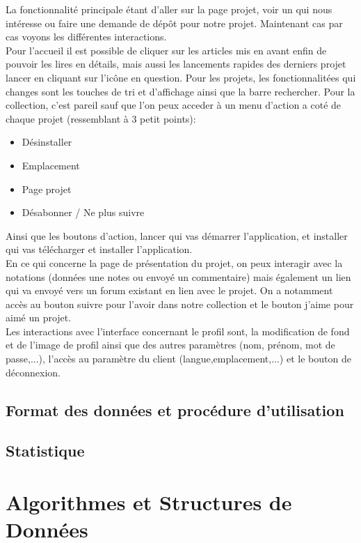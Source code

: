 \documentclass{report}
\begin{document}
\vspace{0.5cm}
La fonctionnalité principale étant d'aller sur la page projet, voir un qui nous intéresse ou faire une demande de dépôt pour notre projet. Maintenant cas par cas voyons les différentes interactions.\\
Pour l'accueil il est possible de cliquer sur les articles mis en avant enfin de pouvoir les lires en détails, mais aussi les lancements rapides des derniers projet lancer en cliquant sur l'icône en question. Pour les projets, les fonctionnalitées qui changes sont les touches de tri et d'affichage ainsi que la barre rechercher. Pour la collection, c'est pareil sauf que l'on peux acceder à un menu d'action a coté de chaque projet (ressemblant à 3 petit points):
\begin{itemize}
    \item Désinstaller
    \item Emplacement
    \item Page projet
    \item Désabonner / Ne plus suivre
\end{itemize}
Ainsi que les boutons d'action, lancer qui vas démarrer l'application, et installer qui vas télécharger et installer l'application.\\
En ce qui concerne la page de présentation du projet, on peux interagir avec la notations (données une notes ou envoyé un commentaire) mais également un lien qui va envoyé vers un forum existant en lien avec le projet. On a notamment accès au bouton suivre pour l'avoir dans notre collection et le bouton j'aime pour aimé un projet.\\
Les interactions avec l'interface concernant le profil sont, la modification de fond et de l'image de profil ainsi que des autres paramètres (nom, prénom, mot de passe,...), l'accès au paramètre du client (langue,emplacement,...) et le bouton de déconnexion.

\section{Format des données et procédure d'utilisation} %
\section{Statistique} %

\chapter{Algorithmes et Structures de Données}
\end{document}
